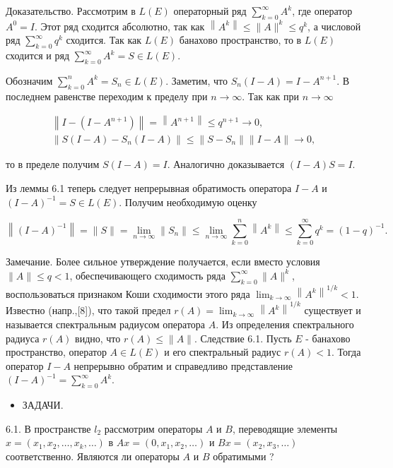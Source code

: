Доказательство. Рассмотрим в $L(E)$ операторный ряд $\sum_{k=0}^{\infty} A^{k}$, где оператор $A^{0}=I$. Этот ряд сходится абсолютно, так как $\left\|A^{k}\right\| \leq\|A\|^{k} \leq q^{k}$, а числовой ряд $\sum_{k=0}^{\infty} q^{k}$ сходится. Так как $L(E)$ банахово пространство, то в $L(E)$ сходится и ряд $\sum_{k=0}^{\infty} A^{k}=S \in L(E)$.

Обозначим $\sum_{k=0}^{n} A^{k}=S_{n} \in L(E)$. Заметим, что $S_{n}(I-A)=I-A^{n+1}$. В последнем равенстве переходим к пределу при $n \rightarrow \infty$. Так как при $n \rightarrow \infty$

$$
\begin{gathered}
\left\|I-\left(I-A^{n+1}\right)\right\|=\left\|A^{n+1}\right\| \leq q^{n+1} \rightarrow 0, \\
\left\|S(I-A)-S_{n}(I-A)\right\| \leq\left\|S-S_{n}\right\|\|I-A\| \rightarrow 0,
\end{gathered}
$$

то в пределе получим $S(I-A)=I$. Аналогично доказывается $(I-A) S=I$.

Из леммы 6.1 теперь следует непрерывная обратимость оператора $I-A$ и $(I-A)^{-1}=S \in L(E)$. Получим необходимую оценку

$$
\left\|(I-A)^{-1}\right\|=\|S\|=\lim _{n \rightarrow \infty}\left\|S_{n}\right\| \leq \lim _{n \rightarrow \infty} \sum_{k=0}^{n}\left\|A^{k}\right\| \leq \sum_{k=0}^{\infty} q^{k}=(1-q)^{-1} .
$$

Замечание. Более сильное утверждение получается, если вместо условия $\|A\| \leq q<1$, обеспечивающего сходимость ряда $\sum_{k=0}^{\infty}\|A\|^{k}$, воспользоваться признаком Коши сходимости этого ряда $\lim _{k \rightarrow \infty}\left\|A^{k}\right\|^{1 / k}<1$. Известно (напр.,[8]), что такой предел $r(A)=\lim _{k \rightarrow \infty}\left\|A^{k}\right\|^{1 / k}$ существует и называется спектральным радиусом оператора $A$. Из определения спектрального радиуса $r(A)$ видно, что $r(A) \leq\|A\|$. Следствие 6.1. Пусть $E$ - банахово пространство, оператор $A \in L(E)$ и его спектральный радиус $r(A)<1$. Тогда оператор $I-A$ непрерывно обратим и справедливо представление $(I-A)^{-1}=\sum_{k=0}^{\infty} A^{k}$.

\begin{itemize}
  \item ЗАДАЧИ.
\end{itemize}

6.1. В пространстве $l_{2}$ рассмотрим операторы $A$ и $B$, переводящие элементы $x=\left(x_{1}, x_{2}, \ldots, x_{k}, \ldots\right)$ в $A x=\left(0, x_{1}, x_{2}, \ldots\right)$ и $B x=\left(x_{2}, x_{3}, \ldots\right)$ соответственно. Являются ли операторы $A$ и $B$ обратимыми ?

